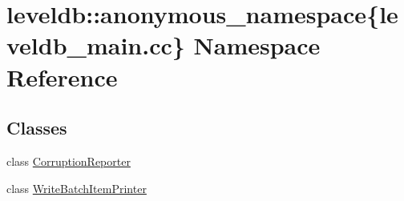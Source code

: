 \hypertarget{namespaceleveldb_1_1anonymous__namespace_02leveldb__main_8cc_03}{}\section{leveldb\+:\+:anonymous\+\_\+namespace\{leveldb\+\_\+main.\+cc\} Namespace Reference}
\label{namespaceleveldb_1_1anonymous__namespace_02leveldb__main_8cc_03}
\subsection*{Classes}
\begin{DoxyCompactItemize}
\item 
class \hyperlink{classleveldb_1_1anonymous__namespace_02leveldb__main_8cc_03_1_1_corruption_reporter}{Corruption\+Reporter}
\item 
class \hyperlink{classleveldb_1_1anonymous__namespace_02leveldb__main_8cc_03_1_1_write_batch_item_printer}{Write\+Batch\+Item\+Printer}
\end{DoxyCompactItemize}
